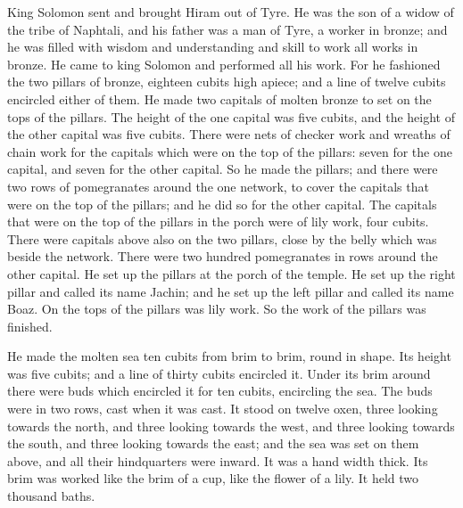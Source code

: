  King Solomon sent and brought Hiram out of Tyre.
 He was the son of a widow of the tribe of Naphtali, and
his father was a man of Tyre, a worker in bronze; and he was filled with
wisdom and understanding and skill to work all works in bronze. He came
to king Solomon and performed all his work.  For he
fashioned the two pillars of bronze, eighteen cubits high apiece; and a
line of twelve cubits encircled either of them.  He made
two capitals of molten bronze to set on the tops of the pillars. The
height of the one capital was five cubits, and the height of the other
capital was five cubits.  There were nets of checker work
and wreaths of chain work for the capitals which were on the top of the
pillars: seven for the one capital, and seven for the other capital.
 So he made the pillars; and there were two rows of
pomegranates around the one network, to cover the capitals that were on
the top of the pillars; and he did so for the other capital.
 The capitals that were on the top of the pillars in the
porch were of lily work, four cubits.  There were
capitals above also on the two pillars, close by the belly which was
beside the network. There were two hundred pomegranates in rows around
the other capital.  He set up the pillars at the porch of
the temple. He set up the right pillar and called its name Jachin; and
he set up the left pillar and called its name Boaz.  On
the tops of the pillars was lily work. So the work of the pillars was
finished.

 He made the molten sea ten cubits from brim to brim,
round in shape. Its height was five cubits; and a line of thirty cubits
encircled it.  Under its brim around there were buds
which encircled it for ten cubits, encircling the sea. The buds were in
two rows, cast when it was cast.  It stood on twelve
oxen, three looking towards the north, and three looking towards the
west, and three looking towards the south, and three looking towards the
east; and the sea was set on them above, and all their hindquarters were
inward.  It was a hand width thick. Its brim was worked
like the brim of a cup, like the flower of a lily. It held two thousand
baths.

